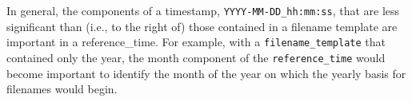 \vspace{12pt}
 \newline
\hspace*{\mutindent}{\tt type="output"} \newline
\hspace*{\mutindent}{\tt filename\_template="diagnostics.\$Y-\$M.nc"} \newline
\hspace*{\mutindent}{\tt filename\_interval="01-00\_00:00:00"} \newline
\hspace*{\mutindent}{\tt reference\_time="2014-01-01\_00:00:00"} \newline
\hspace*{\mutindent}{\tt precision="single"} \newline
\hspace*{\mutindent}{\tt clobber\_mode="append"} \newline
\hspace*{\mutindent}{\tt output\_interval="6:00:00" />} \newline
\newline
\hspace*{1cm}{\tt <var name="u10"/>} \newline
\hspace*{1cm}{\tt <var name="v10"/>} \newline
\hspace*{1cm}{\tt <var name="t2"/>} \newline
\hspace*{1cm}{\tt <var name="q2"/>} \newline
\newline
{} \newline
\vspace{12pt}

In general, the components of a timestamp, {\tt YYYY-MM-DD\_hh:mm:ss}, that are less significant than (i.e., to the right of) 
those contained in a filename template are important in a reference\_time. For example, with a {\tt filename\_template} that contained
only the year, the month component of the {\tt reference\_time} would become important to identify the month of the year on which
the yearly basis for filenames would begin.


